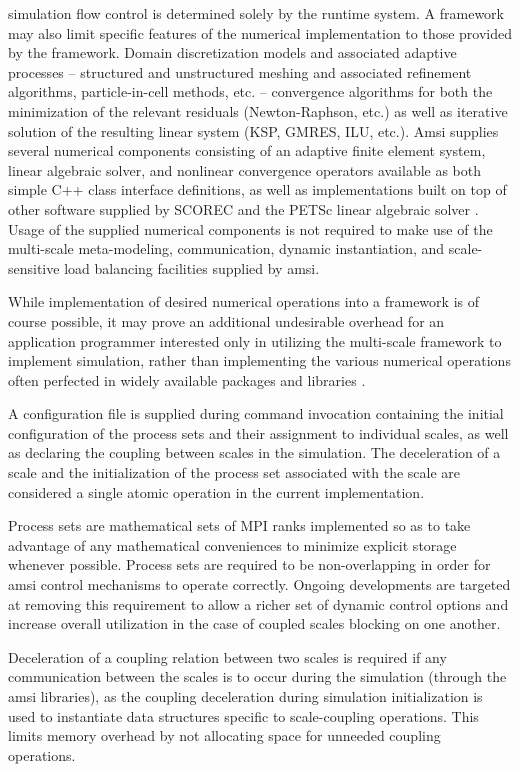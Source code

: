 \documentclass[11pt]{siamltex1213}
\begin{document}
simulation flow control is determined solely by the runtime system. A framework may also limit specific features of the numerical implementation to those provided by the framework. Domain discretization models and associated adaptive processes -- structured and unstructured meshing and associated refinement algorithms, particle-in-cell methods, etc. -- convergence algorithms for both the minimization of the relevant residuals (Newton-Raphson, etc.) as well as iterative solution of the resulting linear system (KSP, GMRES, ILU, etc.). Amsi supplies several numerical components consisting of an adaptive finite element system, linear algebraic solver, and nonlinear convergence operators available as both simple C++ class interface definitions, as well as implementations built on top of other software supplied by SCOREC \cite{core} and the PETSc linear algebraic solver \cite{petsc-web-page} \cite{petsc-user-ref} \cite{petsc-efficient}. Usage of the supplied numerical components is not required to make use of the multi-scale meta-modeling, communication, dynamic instantiation, and scale-sensitive load balancing facilities supplied by amsi.

While implementation of desired numerical operations into a framework is of course possible, it may prove an additional undesirable overhead for an application programmer interested only in utilizing the multi-scale framework to implement simulation, rather than implementing the various numerical operations often perfected in widely available packages and libraries \cite{} \cite{} \cite{}.

\label{amsi_scales}
A configuration file is supplied during command invocation containing the initial configuration of the process sets and their assignment to individual scales, as well as declaring the coupling between scales in the simulation. The deceleration of a scale and the initialization of the process set associated with the scale are considered a single atomic operation in the current implementation.

Process sets are mathematical sets of MPI ranks implemented so as to take advantage of any mathematical conveniences to minimize explicit storage whenever possible. Process sets are required to be non-overlapping in order for amsi control mechanisms to operate correctly. Ongoing developments are targeted at removing this requirement to allow a richer set of dynamic control options and increase overall utilization in the case of coupled scales blocking on one another. 

Deceleration of a coupling relation between two scales is required if any communication between the scales is to occur during the simulation (through the amsi libraries), as the coupling deceleration during simulation initialization is used to instantiate data structures specific to scale-coupling operations. This limits memory overhead by not allocating space for unneeded coupling operations.
\end{document}
